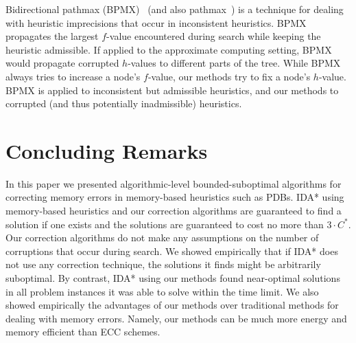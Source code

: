 \documentclass[letterpaper]{article}
\begin{document}
Bidirectional pathmax (BPMX)~\cite{FelnerZHSSZ11} (and also pathmax~\cite{mero1984aHeuristicSearch}) is a technique for dealing with heuristic imprecisions that occur in inconsistent heuristics. BPMX propagates the largest $f$-value encountered during search while keeping the heuristic admissible. If applied to the approximate computing setting, BPMX would propagate corrupted $h$-values to different parts of the tree. While BPMX always tries to increase a node's $f$-value, our methods try to fix a node's $h$-value. %
BPMX is applied to inconsistent but admissible heuristics,
and our methods to corrupted (and thus potentially inadmissible) heuristics.







































\section{Concluding Remarks}

In this paper we presented algorithmic-level bounded-suboptimal algorithms for correcting memory errors in memory-based heuristics such as PDBs. %
IDA* using memory-based heuristics and our correction algorithms are guaranteed to find a solution if one exists and the solutions are guaranteed to cost no more than $3 \cdot C^*$. Our correction algorithms do not make any assumptions on the number of corruptions that occur during search. We showed empirically that if IDA* does not use any correction technique, the solutions it finds might be arbitrarily suboptimal. %
By contrast, IDA* using our methods found near-optimal solutions in all problem instances it was able to solve within the time limit. We also showed empirically the advantages of our methods over traditional methods for dealing with memory errors. Namely, our methods can be much more energy and memory efficient than ECC schemes.
\end{document}

